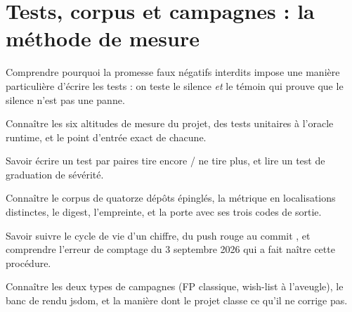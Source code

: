\chapter{Tests, corpus et campagnes : la méthode de mesure}
\label{chap:tests-corpus}

\begin{objectifs}
  \item Comprendre pourquoi la promesse \og faux négatifs interdits\fg{} impose une manière particulière d'écrire les tests : on teste le silence \emph{et} le témoin qui prouve que le silence n'est pas une panne.
  \item Connaître les six altitudes de mesure du projet, des tests unitaires à l'oracle runtime, et le point d'entrée exact de chacune.
  \item Savoir écrire un test par paires \og tire encore\fg{} / \og ne tire plus\fg{}, et lire un test de graduation de sévérité.
  \item Connaître le corpus de quatorze dépôts épinglés, la métrique en localisations distinctes, le digest, l'empreinte, et la porte  avec ses trois codes de sortie.
  \item Savoir suivre le cycle de vie d'un chiffre, du push rouge au commit , et comprendre l'erreur de comptage du 3 septembre 2026 qui a fait naître cette procédure.
  \item Connaître les deux types de campagnes (FP classique, wish-list à l'aveugle), le banc de rendu jsdom, et la manière dont le projet classe ce qu'il ne corrige pas.
\end{objectifs}

